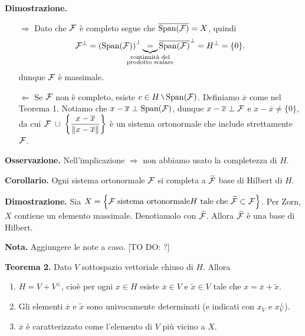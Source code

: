 \begin{itemize}
\textbf{Dimostrazione.}
\begin{itemize}

\item[$\boxed{\Rightarrow}$] Dato che $\mathcal{F}$ è completo segue che $\overline{\operatorname{Span}(\mathcal{F})} = X$, quindi
%
$$
\mc{F}^{\perp} = \left( \spn(\mc{F}) \right)^\perp
\underbrace{=}_{\mathclap{\substack{\text{continuità del} \\ \text{prodotto scalare}}}} \overline{\spn(\mc{F})}^\perp = H^\perp = \{ 0 \}.
$$
%
dunque $\mathcal{F}$ è massimale.

\item[$\boxed{\Leftarrow}$] Se  $\mathcal{F}$ non è completo, esiste $c \in H \setminus \spn(\mc{F})$.
Definiamo $\overline{x}$ come nel Teorema 1. Notiamo che $x - \overline{x} \perp \operatorname{Span}(\mathcal{F})$, dunque $x - \overline{x} \perp \mathcal{F}$ e $x - \overline{x} \neq \{ 0 \}$, da cui $\displaystyle \mathcal{F} \; \cup \; \left\{ \frac{x - \overline{x}}{\left\lVert x - \overline{x} \right\rVert} \right\}$ è un sistema ortonormale che include strettamente $\mathcal{F}$. \absurd

\end{itemize}


\textbf{Osservazione.} Nell'implicazione $\boxed{\Rightarrow}$ non abbiamo usato la completezza di $H$.

\end{itemize}

\vs

\textbf{Corollario.} Ogni sistema ortonormale $\mathcal{F}$ si completa a $\widetilde{\mathcal{F}}$ base di Hilbert di $H$.

\textbf{Dimostrazione.} Sia $X = \left\{ \mathcal{F} \; \text{sistema ortonormale} H \text{ tale che } \widetilde{\mathcal{F}} \subset \mathcal{F} \right\}$.
Per Zorn, $X$ contiene un elemento massimale. Denotiamolo con $\widetilde{\mathcal{F}}$. Allora $\widetilde{\mathcal{F}}$ è una base di Hilbert.

\vs

\textbf{Nota.} Aggiungere le note a caso. [TO DO: ?]

\vs

\textbf{Teorema 2.} Dato $V$ sottospazio vettoriale chiuso di $H$. Allora
\begin{enumerate}
\item $H = V + V^\perp$, cioè per ogni $x \in H$ esiste $\overline{x} \in V$ e $\tilde{x} \in V$ tale che $x = \overline{x} + \tilde{x}$.

\item Gli elementi $\overline{x}$ e $\tilde{x}$ sono univocamente determinati (e indicati con $x_V$ e $x_V^\perp$).

\item $\overline{x}$ è caratterizzato come l'elemento di $V$ più vicino a $X$.
\end{enumerate}

